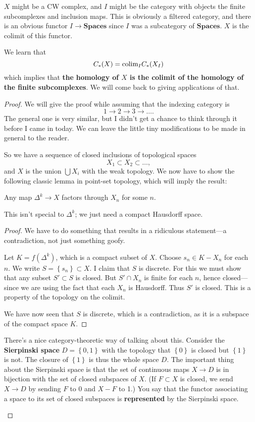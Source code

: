 \begin{example} 
$X$ might be a CW complex, and  $I$ might be the category with objects the finite
subcomplexes and inclusion maps.  This is obviously a filtered category, and
there is an obvious functor $I \to \mathbf{Spaces}$ since $I$ was a subcategory
of $\mathbf{Spaces}$. $X$ is the colimit of this functor. 

We learn that
\[ C_*(X) = \mathrm{colim}_I C_*(X_I)  \]
which implies that\textbf{ the homology of $X$ is the colimit of the homology of the
finite subcomplexes}. We will come back to giving applications of that. 
\end{example} 
\begin{proof} 
We will give the proof while assuming that the indexing category is 
\[ 1 \to 2 \to 3 \to \dots.  \]
The general one is very similar, but I didn't get a chance to think through it
before I came in today.
We can leave the little tiny modifications to be made in general to the reader.

So we have  a sequence of closed inclusions of topological spaces
\[ X_1 \subset X_2 \subset \dots,  \]
and $X$ is the union $\bigcup X_i$ with the weak topology. 
We now have to show the following classic lemma in point-set topology, which
will imply the result:

\begin{lemma} 
Any map $\Delta^k \to X$ factors through $X_n$ for some $n$. 
\end{lemma} 
This isn't special to $\Delta^k$; we just need a compact Hausdorff space. 
\begin{proof} 
We have to do something that results in a ridiculous statement---a contradiction, not just something
goofy.

Let $K = f(\Delta^k)$, which is a compact subset of $X$. Choose $s_n \in K -
X_n$ for each $n$. We write $S = \left\{s_n\right\} \subset X$.
I claim that $S$ is discrete.
For this we must show that any subset $S' \subset S$ is closed. But $S' \cap
X_n$ is finite for each $n$, hence closed---since we are using the fact that
each $X_n$ is Hausdorff. Thus $S'$ is closed. This is a property of the
topology on the colimit.

We have now seen that $S$ is discrete, which is a contradiction, as it is a
subspace of the compact space $K$.
\end{proof} 

\begin{remark} 
There's a nice category-theoretic way of talking about this. Consider the
\textbf{Sierpinski space} $D = \left\{0, 1\right\}$ with the topology that
$\left\{0\right\}$ is closed but $\left\{1\right\}$ is not. The closure of
$\left\{1\right\}$ is thus the whole space $D$. The important thing about the
Sierpinski space is that the set of continuous maps $X \to D$ is in bijection
with the set of closed subspaces of $X$. (If $F \subset X$ is closed, we send
$X \to D$ by sending $F$ to $0$ and $X - F$ to 1.)  You say that the functor
associating a space to its set of closed subspaces is \textbf{represented} by
the Sierpinski space. 



\end{remark}
\end{proof}
